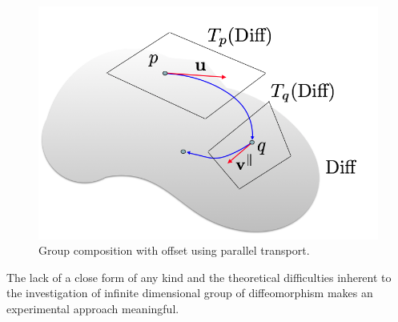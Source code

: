 \begin{figure}[!ht]
	\centering
	\includegraphics[scale=0.25]{figures/parallel_transport_1.png}
	\caption{Group composition with offset using parallel transport.}
	\label{fig:composition}
\end{figure}

The lack of a close form of any kind and the theoretical difficulties inherent to the investigation of infinite dimensional group of diffeomorphism makes an experimental approach meaningful. 











